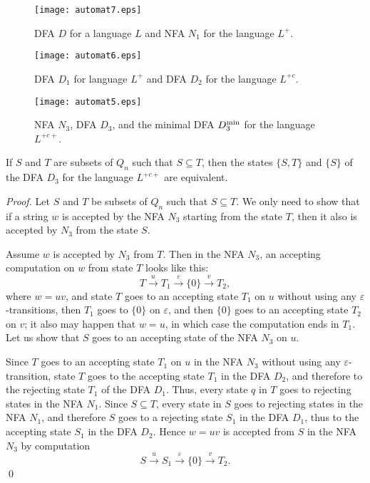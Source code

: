 \documentclass[runningheads]{llncs}
\newcommand{\eps}{\varepsilon}
\begin{document}
\vskip-10pt
\begin{figure}\label{-----fig1}
\centering
\texttt{[image: automat7.eps]}
\caption{DFA $D$ for a language $L$ and NFA $N_1$ for the language $L^+$.}
\label{fig:d_n1}
\end{figure}

\vskip-20pt
\begin{figure}[h!]\label{-----fig2}
\centering
\texttt{[image: automat6.eps]}
\caption{DFA $D_1$ for  language $L^+$ and DFA $D_2$ for the language $L^{+c}$.}
\label{fig:d1d2}
\end{figure}


\begin{figure}[h!]\label{-----fig3}
\centering
\texttt{[image: automat5.eps]}
\caption{NFA $N_3$, DFA $D_3$, and the minimal DFA $D_3^{\rm min}$
          for the language $L^{+c+}$.}
\label{fig:n2d3d3min}
\end{figure}

\begin{lemma}\label{-----le1}
 If $S$ and $T$ are subsets of $Q_n$
 such that $S\subseteq T$,
 then the states $\{S,T\}$ and $\{S\}$ of
 the DFA $D_3$ for the language $L^{+c+}$
 are equivalent.
\end{lemma}

\begin{proof}
 Let $S$ and $T$ be subsets of $Q_n$
 such that $S\subseteq T$.
 We only need to show that
 if a string $w$ is accepted by the NFA $N_3$ starting from the state $T$,
 then it also is accepted by $N_3$ from the state $S$.

 Assume  $w$ is accepted  by $N_3$ from $T$.
 Then in the NFA $N_3$, an accepting computation on $w$ from state $T$
 looks like this:
 $$
     T \stackrel{u }{\rightarrow} T_1 \stackrel{\eps }{\rightarrow}\{0\}
       \stackrel{v }{\rightarrow} T_2,
 $$
 where $w=uv$, and
 state $T$ goes to an accepting state $T_1$ on $u$ 
 without using any $\eps$-transitions,
 then $T_1$ goes to $\{0\}$ on $\eps$,
 and then $\{0\}$ goes to an accepting state $T_2$
 on $v$; it also may happen that $w=u$, in which case
 the computation ends in $T_1$.
 Let us show that $S$ goes to an accepting state of the NFA $N_3$ on $u$.

 Since $T$ goes to an accepting state $T_1$ on $u$ in the NFA $N_3$
 without using any $\eps$-transition,
 state $T$ goes to the accepting state $T_1$ in the DFA $D_2$,
 and therefore to the rejecting state $T_1$ of the DFA $D_1$.
 Thus, every state $q$ in $T$ goes to  rejecting states in the NFA $N_1$.
 Since $S\subseteq T$, every state in $S$ goes to
 rejecting states in the NFA $N_1$,
 and therefore $S$ goes to a rejecting state $S_1$ in the DFA $D_1$,
 thus to the accepting state $S_1$ in the DFA  $D_2$.
 Hence $w=uv$ is accepted from $S$ in the NFA $N_3$
 by computation
 $$
     S \stackrel{u }{\rightarrow} S_1 \stackrel{\eps }{\rightarrow}\{0\}
       \stackrel{v }{\rightarrow} T_2.
 $$
\qed
\end{proof}
\end{document}
